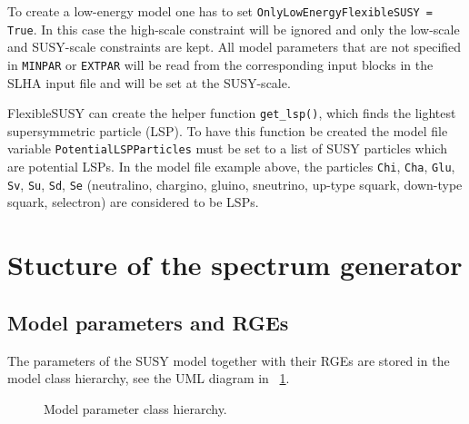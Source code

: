 \documentclass[final,3p,11pt,pdflatex]{elsarticle}
\newcommand{\fs}{FlexibleSUSY\xspace}
\newcommand{\code}[1]{\lstinline|#1|}  %
\newcommand{\figref}[1]{\figurename~\ref{#1}}
\begin{document}
To create a low-energy model one has to set
\code{OnlyLowEnergyFlexibleSUSY = True}.  In this case the high-scale
constraint will be ignored and only the low-scale and SUSY-scale
constraints are kept.  All model parameters that are not specified in
\code{MINPAR} or \code{EXTPAR} will be read from the corresponding
input blocks in the SLHA input file and will be set at the SUSY-scale.

\fs can create the helper function \code{get_lsp()}, which finds the
lightest supersymmetric particle (LSP).  To have this function be
created the model file variable \code{PotentialLSPParticles} must be
set to a list of SUSY particles which are potential LSPs.  In the
model file example above, the particles \code{Chi}, \code{Cha},
\code{Glu}, \code{Sv}, \code{Su}, \code{Sd}, \code{Se} (neutralino,
chargino, gluino, sneutrino, up-type squark, down-type squark,
selectron) are considered to be LSPs.

\section{Stucture of the spectrum generator}
\label{Sec:SpecGenStruct}
\subsection{Model parameters and RGEs}

The parameters of the SUSY model together with their RGEs are stored
in the model class hierarchy, see the UML diagram in
\figref{fig:parameter-classes}.
%
\begin{figure}
  \centering
  \caption{Model parameter class hierarchy.}
  \label{fig:parameter-classes}
\end{figure}
\end{document}
